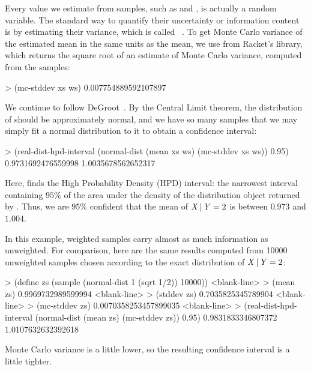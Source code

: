 Every value we estimate from samples, such as  and , is actually a random variable.
The standard way to quantify their uncertainty or information content is by estimating their variance, which is called ~\cite[Chapter~12]{cit:degroot-2012book-probability}.
To get Monte Carlo variance of the estimated mean  in the same units as the mean, we use  from Racket's  library, which returns the square root of an estimate of Monte Carlo variance, computed from the samples:
\begin{center}\singlespacing
\begin{schemedisplay}
> (mc-stddev xs ws)
0.007754889592107897
\end{schemedisplay}
\end{center}
We continue to follow DeGroot~\cite{cit:degroot-2012book-probability}.
By the Central Limit theorem, the distribution of  should be approximately normal, and we have so many samples that we may simply fit a normal distribution to it to obtain a confidence interval:
\begin{center}\singlespacing
\begin{schemedisplay}
> (real-dist-hpd-interval
   (normal-dist (mean xs ws) (mc-stddev xs ws))
   0.95)
0.9731692476559998
1.0035678562652317
\end{schemedisplay}
\end{center}
Here,  finds the High Probability Density (HPD) interval: the narrowest interval containing $95\%$ of the area under the density of the distribution object returned by .
Thus, we are $95\%$ confident that the mean of $\mathit{X} \,|\, \mathit{Y} = 2$ is between $0.973$ and $1.004$.

In this example, weighted samples carry almost as much information as unweighted.
For comparison, here are the same results computed from 10000 unweighted samples chosen according to the exact distribution of $\mathit{X} \,|\, \mathit{Y} = 2$:
\begin{center}\singlespacing
\begin{schemedisplay}
> (define zs (sample (normal-dist 1 (sqrt 1/2)) 10000))
<blank-line>
> (mean zs)
0.9969732989599994
<blank-line>
> (stddev zs)
0.7035825345789904
<blank-line>
> (mc-stddev zs)
0.0070358253457899035
<blank-line>
> (real-dist-hpd-interval
   (normal-dist (mean zs) (mc-stddev zs))
   0.95)
0.9831833346807372
1.0107632632392618
\end{schemedisplay}
\end{center}
Monte Carlo variance is a little lower, so the resulting confidence interval is a little tighter.

